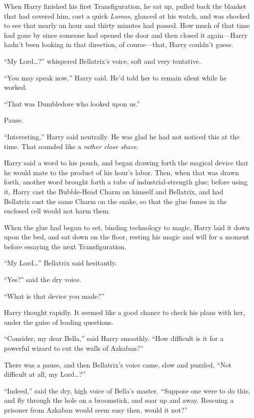 When Harry finished his first Transfiguration, he sat up, pulled back
the blanket that had covered him, cast a quick \emph{Lumos,} glanced at
his watch, and was shocked to see that nearly an hour and thirty minutes
had passed. How much of that time had gone by since someone had opened
the door and then closed it again---Harry hadn't been looking in that
direction, of course---that, Harry couldn't guess.

``My Lord\ldots{}?'' whispered Bellatrix's voice, soft and very
tentative.

``You may speak now,'' Harry said. He'd told her to remain silent while
he worked.

``That was Dumbledore who looked upon us.''

Pause.

``Interesting,'' Harry said neutrally. He was glad he had not noticed
this at the time. That sounded like a \emph{rather close shave}.

Harry said a word to his pouch, and began drawing forth the magical
device that he would mate to the product of his hour's labor. Then, when
that was drawn forth, another word brought forth a tube of
industrial-strength glue; before using it, Harry cast the Bubble-Head
Charm on himself and Bellatrix, and had Bellatrix cast the same Charm on
the snake, so that the glue fumes in the enclosed cell would not harm
them.

When the glue had begun to set, binding technology to magic, Harry laid
it down upon the bed, and sat down on the floor, resting his magic and
will for a moment before essaying the next Transfiguration.

``My Lord\ldots{}'' Bellatrix said hesitantly.

``Yes?'' said the dry voice.

``What is that device you made?''

Harry thought rapidly. It seemed like a good chance to check his plans
with her, under the guise of leading questions.

``Consider, my dear Bella,'' said Harry smoothly. ``How difficult is it
for a powerful wizard to cut the walls of Azkaban?''

There was a pause, and then Bellatrix's voice came, slow and puzzled,
``Not difficult at all, my Lord\ldots{}?''

``Indeed,'' said the dry, high voice of Bella's master. ``Suppose one
were to do this, and fly through the hole on a broomstick, and soar up
and away. Rescuing a prisoner from Azkaban would seem easy then, would
it not?''

